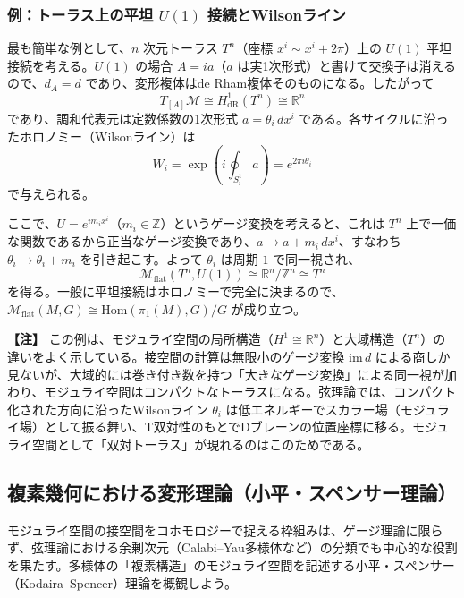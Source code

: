 \documentclass[uplatex, dvipdfmx, book]{jsbook}
\let\origsubsection\subsection
\let\origsubsubsection\subsubsection
\renewcommand{\section}{\origsubsection}
\renewcommand{\subsection}{\origsubsubsection}
\renewcommand{\subsubsection}{\paragraph}
\newenvironment{note}{\vspace{1ex}\par\footnotesize\noindent\textbf{【注】}}{\par\vspace{1ex}}
\begin{document}
\subsection{例：トーラス上の平坦 $U(1)$ 接続とWilsonライン}

最も簡単な例として、$n$ 次元トーラス $T^n$（座標 $x^i \sim x^i + 2\pi$）上の $U(1)$ 平坦接続を考える。$U(1)$ の場合 $A = i a$（$a$ は実1次形式）と書けて交換子は消えるので、$d_A = d$ であり、変形複体はde Rham複体そのものになる。したがって
\begin{equation}
    T_{[A]}\mathcal{M} \cong H^1_{\mathrm{dR}}(T^n) \cong \mathbb{R}^n
\end{equation}
であり、調和代表元は定数係数の1次形式 $a = \theta_i\, dx^i$ である。各サイクルに沿ったホロノミー（Wilsonライン）は
\begin{equation}
    W_i = \exp\left( i \oint_{S^1_i} a \right) = e^{2\pi i \theta_i}
\end{equation}
で与えられる。

ここで、$U = e^{i m_i x^i}$（$m_i \in \mathbb{Z}$）というゲージ変換を考えると、これは $T^n$ 上で一価な関数であるから正当なゲージ変換であり、$a \to a + m_i\, dx^i$、すなわち $\theta_i \to \theta_i + m_i$ を引き起こす。よって $\theta_i$ は周期 $1$ で同一視され、
\begin{equation}
    \mathcal{M}_{\text{flat}}(T^n, U(1)) \cong \mathbb{R}^n / \mathbb{Z}^n \cong T^n
\end{equation}
を得る。一般に平坦接続はホロノミーで完全に決まるので、$\mathcal{M}_{\text{flat}}(M, G) \cong \mathrm{Hom}(\pi_1(M), G)/G$ が成り立つ。

\begin{note}
この例は、モジュライ空間の局所構造（$H^1 \cong \mathbb{R}^n$）と大域構造（$T^n$）の違いをよく示している。接空間の計算は無限小のゲージ変換 $\mathrm{im}\, d$ による商しか見ないが、大域的には巻き付き数を持つ「大きなゲージ変換」による同一視が加わり、モジュライ空間はコンパクトなトーラスになる。弦理論では、コンパクト化された方向に沿ったWilsonライン $\theta_i$ は低エネルギーでスカラー場（モジュライ場）として振る舞い、T双対性のもとでDブレーンの位置座標に移る。モジュライ空間として「双対トーラス」が現れるのはこのためである。
\end{note}

\section{複素幾何における変形理論（小平・スペンサー理論）}

モジュライ空間の接空間をコホモロジーで捉える枠組みは、ゲージ理論に限らず、弦理論における余剰次元（Calabi--Yau多様体など）の分類でも中心的な役割を果たす。多様体の「複素構造」のモジュライ空間を記述する小平・スペンサー（Kodaira--Spencer）理論\cite{kodairaspencer1958}を概観しよう。
\end{document}
